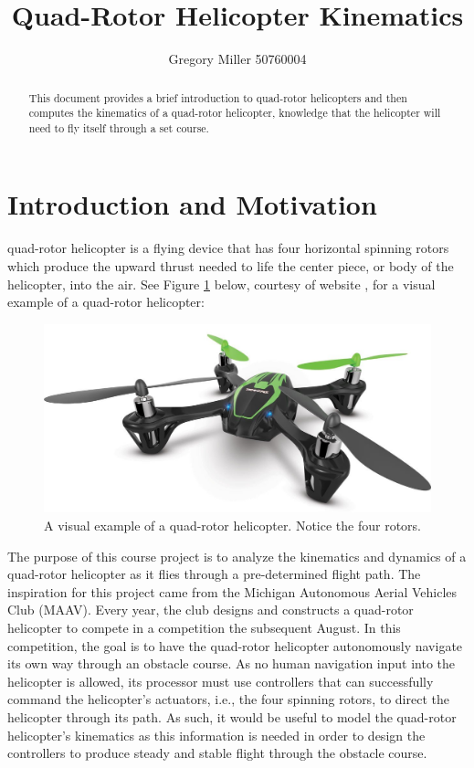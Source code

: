 \documentclass[journal]{IEEEtran}
\begin{document}
\title{Quad-Rotor Helicopter Kinematics}

\author{{Gregory Miller 50760004}}

{}

\maketitle

\begin{abstract}
This document provides a brief introduction to quad-rotor helicopters and then computes the kinematics of a quad-rotor helicopter, knowledge that the helicopter will need to fly itself through a set course.   
\end{abstract}

\IEEEpeerreviewmaketitle

\section{Introduction and Motivation}
\label{sec:intro_section}

quad-rotor helicopter is a flying device that has four horizontal spinning rotors which produce the upward thrust needed to life the center piece, or body of the helicopter, into the air. See Figure \ref{fig:quad_intro} below, courtesy of website \cite{quad_intro}, for a visual example of a quad-rotor helicopter:

\begin{figure}[ht]
    \centering
        \includegraphics[width=.30\textwidth]{quad_intro}
    \caption{A visual example of a quad-rotor helicopter. Notice the four rotors.}
    \label{fig:quad_intro}
\end{figure}

 The purpose of this course project is to analyze the kinematics and dynamics of a quad-rotor helicopter as it flies through a pre-determined flight path. The inspiration for this project came from the Michigan Autonomous Aerial Vehicles Club (MAAV). Every year,
 the club designs and constructs a quad-rotor helicopter to compete in a competition the subsequent August. In this competition, the goal is to have the quad-rotor helicopter autonomously navigate its own way through an obstacle course. As no human navigation input into the helicopter is allowed, its processor must use controllers
 that can successfully command the helicopter's actuators, i.e., the four spinning rotors, to direct the helicopter through its path. As such, it would be useful to model the quad-rotor helicopter's kinematics as this information is needed in order to design the controllers to produce steady and stable flight through the
 obstacle course.   
\end{document}
